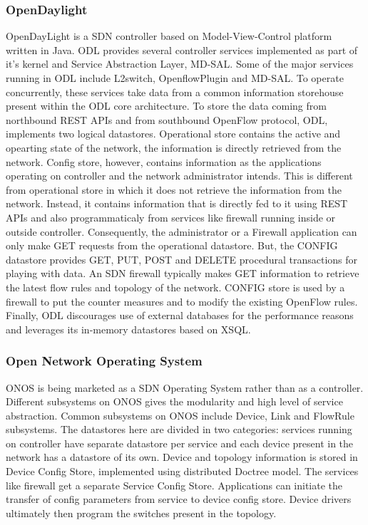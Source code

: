 \subsubsection{OpenDaylight}
OpenDayLight is a SDN controller based on Model-View-Control platform written in Java. ODL provides several controller services implemented as part of it's kernel and Service Abstraction Layer, MD-SAL. Some of the major services running in ODL include L2switch, OpenflowPlugin and MD-SAL. To operate concurrently, these services take data from a common information storehouse present within the ODL core architecture. To store the data coming from northbound REST APIs and from southbound OpenFlow protocol, ODL, implements two logical datastores. Operational store contains the active and opearting state of the network, the information is directly retrieved from the network. Config store, however, contains information as the applications operating on controller and the network administrator intends. This is different from operational store in which it does not retrieve the information from the network. Instead, it contains information  that is directly fed to it using REST APIs and also programmaticaly from services like firewall running inside or outside controller.
Consequently, the administrator or a Firewall application can only make GET requests from the operational datastore. But, the CONFIG datastore provides GET, PUT, POST and DELETE procedural transactions for playing with data. An SDN firewall typically makes GET information to retrieve the latest flow rules and topology of the network. CONFIG store is used by a firewall to put the counter measures and to modify the existing OpenFlow rules. Finally, ODL discourages use of external databases for the performance reasons and leverages its in-memory datastores based on XSQL. 

\subsubsection{Open Network Operating System}

ONOS is being marketed as a SDN Operating System rather than as a controller. Different subsystems on ONOS gives the modularity and high level of service abstraction. Common subsystems on ONOS include Device, Link and FlowRule subsystems. The datastores here are divided in two categories: services running on controller have separate datastore per service and each device present in the network has a datastore of its own. Device and topology information is stored in Device Config Store, implemented using distributed Doctree model. The services like firewall get a separate Service Config Store. Applications can initiate the transfer of config parameters from service to device config store. Device drivers ultimately then program the switches present in the topology.  

